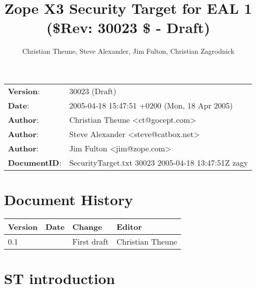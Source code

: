 \documentclass[10pt,a4paper,english]{book}
\title{Zope X3 Security Target for EAL 1 ({\$}Rev: 30023 {\$} - Draft)}
\author{Christian Theune, Steve Alexander, Jim Fulton, Christian Zagrodnick}
\date{}
\newlength{\docinfowidth}
\begin{document}
\maketitle


\begin{center}
\begin{tabularx}{\docinfowidth}{lX}
\textbf{Version}: &
	30023 (Draft) \\
\textbf{Date}: &
	2005-04-18 15:47:51 +0200 (Mon, 18 Apr 2005) \\
\textbf{Author}: &
	Christian Theune {\textless}ct@gocept.com{\textgreater} \\
\textbf{Author}: &
	Steve Alexander {\textless}steve@catbox.net{\textgreater} \\
\textbf{Author}: &
	Jim Fulton {\textless}jim@zope.com{\textgreater} \\
\textbf{DocumentID}: &
	SecurityTarget.txt 30023 2005-04-18 13:47:51Z zagy \\
\end{tabularx}
\end{center}

\tableofcontents



\hypertarget{document-history}{}
\chapter{Document History}

\begin{longtable}{|l|l|l|l|}
\hline
\textbf{
Version
} & \textbf{
Date
} & \textbf{
Change
} & \textbf{
Editor
} \\
\hline
\endhead

0.1
 &  & 
First draft
 & 
Christian Theune
 \\
\hline
\end{longtable}



\hypertarget{st-introduction}{}
\chapter{ST introduction}
\end{document}
